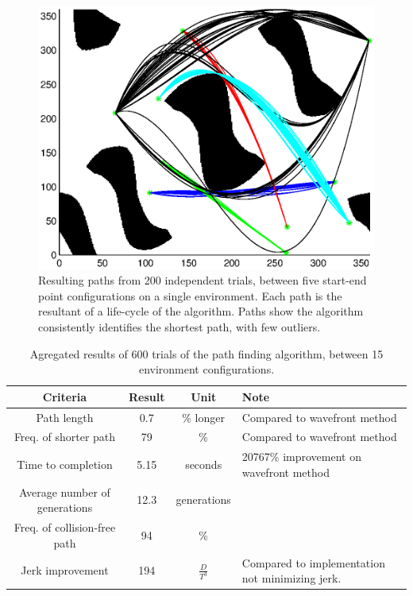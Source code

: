 \begin{figure}[h]
	\centering
	\includegraphics[width=\figWidth]{./figures/results_cSpace4.eps}
	\caption{Resulting paths from 200 independent trials, between five start-end point configurations on a single environment. Each path is the resultant of a life-cycle of the algorithm. Paths show the algorithm consistently identifies the shortest path, with few outliers.}
	\label{fig:res600}
\end{figure}

\begin{table}
\renewcommand{\arraystretch}{1.4}
\caption{Agregated results of 600 trials of the path finding algorithm, between 15 environment configurations.}
\label{tbl:results}
\begin{center}
		\begin{tabular}{ c | c  c  p{1.8cm} }
		Criteria & Result & Unit & Note \\ \hline
		Path length & 0.7 & \% longer & Compared to wavefront method \\
		Freq. of shorter path & 79 & \% & Compared to wavefront method \\
		Time to completion & 5.15 & seconds & 20767\% improvement on wavefront method \\
		Average number of generations & 12.3 & generations & \\
		Freq. of collision-free path & 94 & \% &  \\
		Jerk improvement & 194 & ${\frac{D}{T^3}}$ & Compared to implementation not minimizing jerk.\\
\end{tabular}
\end{center}
\end{table}